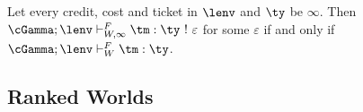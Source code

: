\begin{example}[Cycle at $N = 4$ \rocq{cy_lock_free}]
\label{ex:cycle}

\end{example}



\begin{theorem}
\label{thm:conserv}
Let every credit, cost and ticket in $\lenv$ and $\ty$ be $\infty$. Then $\cGamma ; \lenv \vdash^{F}_{W,\infty} \tm : \ty\ !\ \varepsilon$ for some $\varepsilon$ if and only if $\cGamma ; \lenv \vdash^{F}_{W} \tm : \ty$.
\end{theorem}


\subsection{Ranked Worlds}
\label{sec:lf-ranked}

